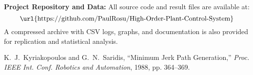 \documentclass[12pt]{article}
\begin{document}
\vspace{1em}
\noindent
\textbf{Project Repository and Data:} 
All source code and result files are available at:
\[
\text{\url{https://github.com/PaulRosu/High-Order-Plant-Control-System}}
\]
A compressed archive with CSV logs, graphs, and documentation is also provided for replication and statistical analysis.


\begin{thebibliography}{9}

K.~J.~Kyriakopoulos and G.~N.~Saridis,
\newblock ``Minimum Jerk Path Generation,''
\newblock \emph{Proc. IEEE Int. Conf. Robotics and Automation}, 1988, pp. 364--369.

\end{thebibliography}
\end{document}
